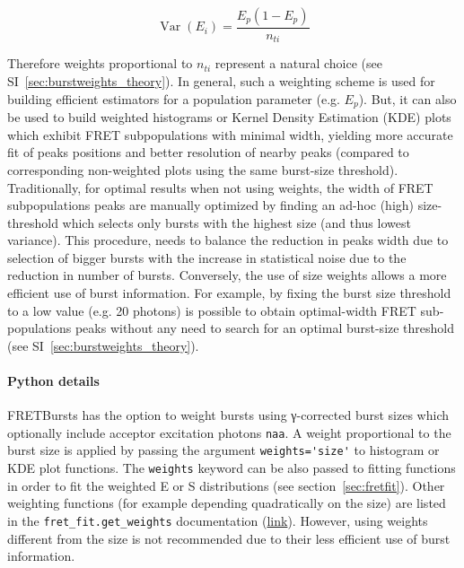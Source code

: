 \begin{equation}
\label{eq:var_e}
\operatorname{Var}\left( E_i \right)
= \frac{E_p(1-E_p)}{n_{ti}}
\end{equation}

Therefore weights proportional to $n_{ti}$ represent a natural choice (see SI~\ref{sec:burstweights_theory}).
In general, such a weighting scheme is used for building efficient estimators for a population
parameter (e.g. $E_p$). But, it can also be used to build weighted histograms or Kernel Density
Estimation (KDE) plots which exhibit FRET subpopulations with minimal width,
yielding more accurate fit of peaks positions and better resolution of nearby peaks
(compared to corresponding non-weighted plots using the same burst-size threshold).
Traditionally, for optimal results when not using weights, the width of 
FRET subpopulations peaks are manually optimized by finding an ad-hoc (high) 
size-threshold which selects only bursts with the highest size (and thus lowest variance).
This procedure, needs to balance the reduction in peaks width due to selection of bigger bursts
with the increase in statistical noise due to the reduction in number of bursts.
Conversely, the use of size weights allows a more efficient use of burst information.
For example, by fixing the burst size threshold to a low value (e.g. 20 photons) is possible 
to obtain optimal-width FRET sub-populations peaks without any need to search
for an optimal burst-size threshold (see SI~\ref{sec:burstweights_theory}).

\paragraph{Python details}
FRETBursts has the option to weight bursts using γ-corrected
burst sizes which optionally include acceptor excitation photons \verb|naa|.
A weight proportional to the burst size is applied by passing the argument
\verb|weights='size'| to histogram or KDE plot functions. The \verb|weights|
keyword can be also passed to fitting functions in order to fit
the weighted E or S distributions (see section~\ref{sec:fretfit}).
Other weighting functions (for example depending quadratically on the size) 
are listed in the \verb|fret_fit.get_weights| documentation
(\href{http://fretbursts.readthedocs.org/en/latest/fret_fit.html#fretbursts.fret_fit.get_weights}{link}).
However, using weights different from the size is not recommended 
due to their less efficient use of burst information.